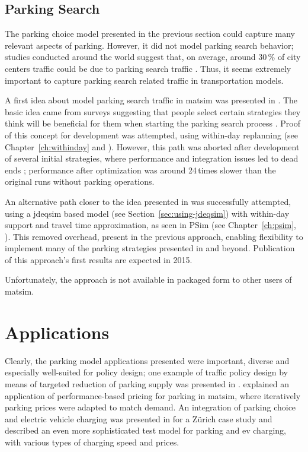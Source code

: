 \subsection{Parking Search}
The parking choice model presented in the previous section could capture many relevant aspects of parking. However, it did not model parking search behavior;  studies conducted around the world suggest that, on average, around 30\,\% of city centers traffic could be due to parking search traffic \citet[][]{Shoup_RSUE_2004}. Thus, it seems extremely important to capture parking search related traffic in transportation models.

A first idea about model parking search traffic in \gls{matsim} was presented in \citet[][]{Waraich_unpub_IATBR_2012}. The basic idea came from surveys suggesting that people select certain strategies they think will be beneficial for them when starting the parking search process \citep[][]{AxhausenPolak_1989}. Proof of this concept for development was attempted, using within-day replanning (see Chapter~\ref{ch:withinday} and \citet[][]{DoblerEtAl_TRR_2012}). However, this path was aborted after development of several initial strategies, where performance and integration issues led to dead ends \citep[][]{WaraichEtAl_unpub_TRB_2013}; performance after optimization was around 24\,times slower than the original runs without parking operations. 

An alternative path closer to the idea presented in \citet[][]{Waraich_unpub_IATBR_2012} was successfully attempted, using a \gls{jdeqsim} based model (see Section~\ref{sec:using-jdeqsim}) with within-day support and travel time approximation, as seen in PSim (see Chapter~\ref{ch:psim}, \citet[][]{FourieEtAl_TRR_2013}). This removed overhead, present in the previous approach, enabling flexibility to implement many of the parking strategies presented in \citet[][]{AxhausenPolak_1989} and beyond. Publication of this approach's first results are expected in 2015.

Unfortunately, the approach is not available in packaged form to other users of \gls{matsim}. 

\section{Applications}
Clearly, the parking model applications presented were important, diverse  and especially well-suited for policy design; one example of traffic policy design by means of targeted reduction of parking supply was presented in \citet[][]{WaraichAxhausen_TRR_2012}. \citet[][]{WaraichEtAl_unpub_TRB_2013} explained an application of performance-based pricing for parking in \gls{matsim}, where iteratively parking prices were adapted to match demand. An integration of parking choice and electric vehicle charging was presented in \citet[][]{WaraichEtAl_JanssensEtAl_2014} for a Zürich case study and \citet[][]{BemetzHohenfellner_BSCThesis_2014} described an even more sophisticated test model for parking and \gls{ev} charging, with various types of charging speed and prices.

